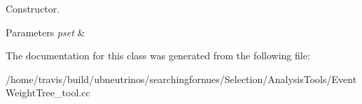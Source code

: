 Constructor. 


\begin{DoxyParams}{Parameters}
{\em pset} & \\
\hline
\end{DoxyParams}


The documentation for this class was generated from the following file\+:\begin{DoxyCompactItemize}
\item 
/home/travis/build/ubneutrinos/searchingfornues/\+Selection/\+Analysis\+Tools/Event\+Weight\+Tree\+\_\+tool.\+cc\end{DoxyCompactItemize}

